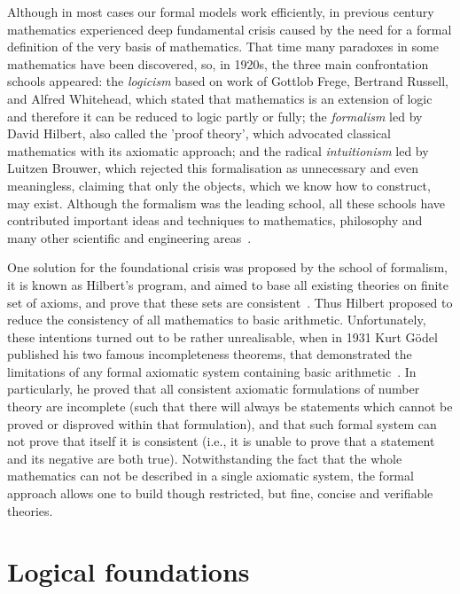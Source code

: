 \documentclass[article]{aaltoseries}
\begin{document}
Although in most cases our formal models work efficiently, in previous century mathematics experienced deep fundamental crisis caused by the need for a formal definition of the very basis of mathematics. That time many paradoxes in some mathematics have been discovered, so, in 1920s, the three main confrontation schools appeared:
the \textit{logicism} based on work of Gottlob Frege, Bertrand Russell, and Alfred Whitehead, which stated that mathematics is an extension of logic and therefore it can be reduced to logic partly or fully;
the \textit{formalism} led by David Hilbert, also called the 'proof theory', which advocated classical mathematics with its axiomatic approach;
and the radical \textit{intuitionism} led by Luitzen Brouwer, which rejected this formalisation as unnecessary and even meaningless, claiming that only the objects, which we know how to construct, may exist.
Although the formalism was the leading school, all these schools have contributed important ideas and techniques to mathematics, philosophy and many other scientific and engineering areas~\cite{Fer08}.

One solution for the foundational crisis was proposed by the school of formalism, it is known as Hilbert's program, and aimed to base all existing theories on finite set of axioms, and prove that these sets are consistent~\cite{Zac06}. Thus Hilbert proposed to reduce the consistency of all mathematics to basic arithmetic. 
Unfortunately, these intentions turned out to be rather unrealisable, when in 1931 Kurt Gödel published his two famous incompleteness theorems, that demonstrated the limitations of any formal axiomatic system containing basic arithmetic~\cite{Raa15}. In particularly, he proved that all consistent axiomatic formulations of number theory are incomplete (such that there will always be statements which cannot be proved or disproved within that formulation), and that such formal system can not prove that itself it is consistent (i.e., it is unable to prove that a statement and its negative are both true).
Notwithstanding the fact that the whole mathematics can not be described in a single axiomatic system, the formal approach allows one to build though restricted, but fine, concise and verifiable theories.


\section{Logical foundations}
\label{sec:formal_theory}
\end{document}

